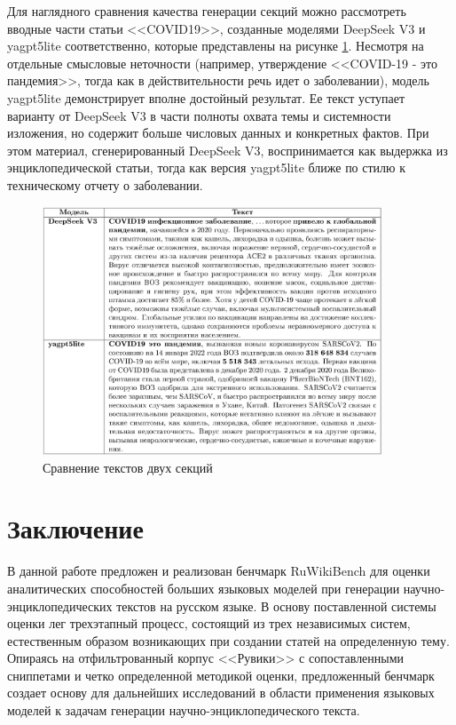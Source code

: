 \documentclass{article}
\begin{document}
Для наглядного сравнения качества генерации секций можно рассмотреть вводные части статьи <<COVID19>>, 
созданные моделями DeepSeek V3 и yagpt5lite соответственно, которые представлены на рисунке \ref{fig:secs_com}.
Несмотря на отдельные смысловые неточности (например, утверждение <<COVID-19 - это пандемия>>, тогда как в действительности речь идет о заболевании), 
модель yagpt5lite демонстрирует вполне достойный результат. Ее текст уступает варианту от DeepSeek V3 в части полноты охвата темы и системности изложения, 
но содержит больше числовых данных и конкретных фактов. При этом материал, сгенерированный DeepSeek V3, воспринимается как выдержка из энциклопедической статьи, 
тогда как версия yagpt5lite ближе по стилю к техническому отчету о заболевании.

\begin{figure}[ht!]
  \centering
  \includegraphics[width=0.9\textwidth]{figures/two_secs.png}
  \caption{Сравнение текстов двух секций}
  \label{fig:secs_com}
\end{figure}

\section*{Заключение}
В данной работе предложен и реализован бенчмарк RuWikiBench для оценки аналитических способностей больших языковых моделей при генерации научно-энциклопедических текстов на русском языке.
В основу поставленной системы оценки лег трехэтапный процесс, состоящий из трех независимых систем, естественным образом возникающих при создании статей на определенную тему.
Опираясь на отфильтрованный корпус <<Рувики>> с сопоставленными сниппетами и четко определенной методикой оценки, 
предложенный бенчмарк создает основу для дальнейших исследований в области применения языковых моделей к задачам генерации научно-энциклопедического текста. 
\end{document}
